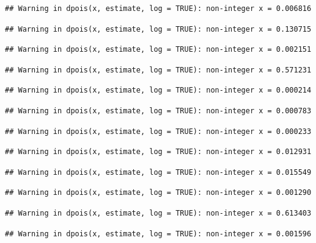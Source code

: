 \documentclass[]{article}
\begin{document}
\begin{verbatim}
## Warning in dpois(x, estimate, log = TRUE): non-integer x = 0.006816
\end{verbatim}

\begin{verbatim}
## Warning in dpois(x, estimate, log = TRUE): non-integer x = 0.130715
\end{verbatim}

\begin{verbatim}
## Warning in dpois(x, estimate, log = TRUE): non-integer x = 0.002151
\end{verbatim}

\begin{verbatim}
## Warning in dpois(x, estimate, log = TRUE): non-integer x = 0.571231
\end{verbatim}

\begin{verbatim}
## Warning in dpois(x, estimate, log = TRUE): non-integer x = 0.000214
\end{verbatim}

\begin{verbatim}
## Warning in dpois(x, estimate, log = TRUE): non-integer x = 0.000783
\end{verbatim}

\begin{verbatim}
## Warning in dpois(x, estimate, log = TRUE): non-integer x = 0.000233
\end{verbatim}

\begin{verbatim}
## Warning in dpois(x, estimate, log = TRUE): non-integer x = 0.012931
\end{verbatim}

\begin{verbatim}
## Warning in dpois(x, estimate, log = TRUE): non-integer x = 0.015549
\end{verbatim}

\begin{verbatim}
## Warning in dpois(x, estimate, log = TRUE): non-integer x = 0.001290
\end{verbatim}

\begin{verbatim}
## Warning in dpois(x, estimate, log = TRUE): non-integer x = 0.613403
\end{verbatim}

\begin{verbatim}
## Warning in dpois(x, estimate, log = TRUE): non-integer x = 0.001596
\end{verbatim}
\end{document}
